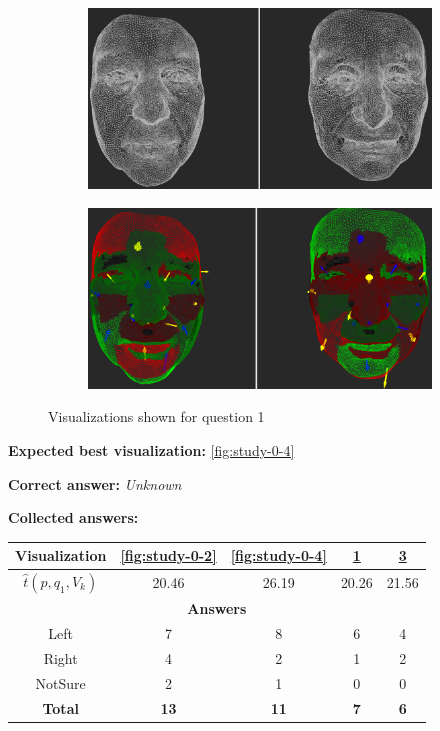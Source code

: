 \begin{figure}[h]
\begin{subfigure}{0.49\textwidth}
\includegraphics[width=\textwidth]{./img-study/pair1.PNG}
\caption{}
\label{fig:study-0-1}
\end{subfigure}
\begin{subfigure}{0.49\textwidth}
\includegraphics[width=\textwidth]{./img-study/pair3.PNG}
\caption{}
\label{fig:study-0-3}
\end{subfigure}
\caption{Visualizations shown for question 1}
\end{figure}
\medskip

{\bf Expected best visualization:} \ref{fig:study-0-4}
\medskip

{\bf Correct answer:} {\it Unknown}
\medskip

{\bf Collected answers:}

\begin{center}
\begin{tabular}{| c | c | c | c | c |}
	\hline
	Visualization & \ref{fig:study-0-2} & \ref{fig:study-0-4} & \ref{fig:study-0-1} & \ref{fig:study-0-3}\\ \hline
	\(\widehat{t}(p, q_1, V_k)\) & 20.46 & 26.19 & 20.26 & 21.56\\ \hline
	\multicolumn{5}{|c|}{\bf Answers} \\ \hline
	Left & 7 & 8 & 6 & 4\\ \hline
	Right & 4 & 2 & 1 & 2\\ \hline
	NotSure & 2 & 1 & 0 & 0\\ \hline
	{\bf Total} & {\bf 13} & {\bf 11} & {\bf 7} & {\bf 6}\\ \hline
\end{tabular}
\end{center}
\clearpage

